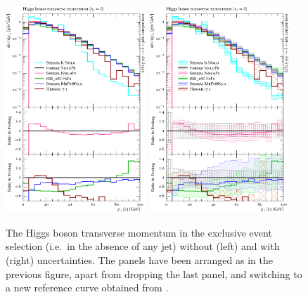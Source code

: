 \begin{figure}[t!]
  \centering
  \includegraphics[width=0.47\textwidth]{figures/hjetscomp_u_H_pT_excl.pdf}
  \hfill
  \includegraphics[width=0.47\textwidth]{figures/hjetscomp_H_pT_excl.pdf}
  \caption{\label{fig:hjetscomp:results:exclobs:hpt}%
    The Higgs boson transverse momentum in the exclusive event
    selection (i.e.~in the absence of any jet) without (left) and with
    (right) uncertainties. The  panels have been arranged as in
    the previous figure, apart from dropping the last panel,  and
    switching to a new reference curve  obtained from
    \Powheg \NNLOPS.}
\end{figure}

